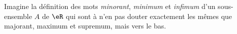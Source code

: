 

\begin{exercice}\label{exo206}
Imagine la définition des mots \emph{minorant}, \emph{minimum} et \emph{infimum} d'un sous-ensemble $A$ de $\eR$ qui sont à n'en pas douter exactement les mêmes que majorant, maximum et supremum, mais vers le bas.
\end{exercice}
